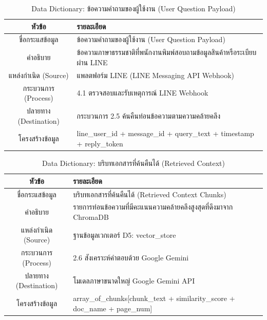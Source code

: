 \begin{table}[htbp]
\centering
\caption{Data Dictionary: ข้อความคำถามของผู้ใช้งาน (User Question Payload)}
\label{tab3:df_question}
\begin{tabularx}{\textwidth}{| c | L |}
\hline
\textbf{หัวข้อ} & \textbf{รายละเอียด} \\ \hline
ชื่อกระแสข้อมูล & ข้อความคำถามของผู้ใช้งาน (User Question Payload) \\ \hline
คำอธิบาย & ข้อความภาษาธรรมชาติที่พนักงานพิมพ์สอบถามข้อมูลสินค้าหรือระเบียบผ่าน LINE \\ \hline
แหล่งกำเนิด (Source) & แพลตฟอร์ม LINE (LINE Messaging API Webhook) \\ \hline
กระบวนการ (Process) & 4.1 ตรวจสอบและรับเหตุการณ์ LINE Webhook \\ \hline
ปลายทาง (Destination) & กระบวนการ 2.5 ค้นคืนท่อนข้อความตามความคล้ายคลึง \\ \hline
โครงสร้างข้อมูล & line\_user\_id + message\_id + query\_text + timestamp + reply\_token \\ \hline
\end{tabularx}
\end{table}

\begin{table}[htbp]
\centering
\caption{Data Dictionary: บริบทเอกสารที่ค้นคืนได้ (Retrieved Context)}
\label{tab3:df_context}
\begin{tabularx}{\textwidth}{| c | L |}
\hline
\textbf{หัวข้อ} & \textbf{รายละเอียด} \\ \hline
ชื่อกระแสข้อมูล & บริบทเอกสารที่ค้นคืนได้ (Retrieved Context Chunks) \\ \hline
คำอธิบาย & รายการท่อนข้อความที่มีคะแนนความคล้ายคลึงสูงสุดที่ดึงมาจาก ChromaDB \\ \hline
แหล่งกำเนิด (Source) & ฐานข้อมูลเวกเตอร์ D5: vector\_store \\ \hline
กระบวนการ (Process) & 2.6 สังเคราะห์คำตอบด้วย Google Gemini \\ \hline
ปลายทาง (Destination) & โมเดลภาษาขนาดใหญ่ Google Gemini API \\ \hline
โครงสร้างข้อมูล & array\_of\_chunks[chunk\_text + similarity\_score + doc\_name + page\_num] \\ \hline
\end{tabularx}
\end{table}

